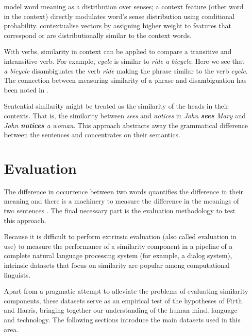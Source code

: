  model word meaning as a distribution over senses; a context feature (other word in the context)  directly modulates word’s sense distribution using conditional probability.  contextualise vectors by assigning higher weight to features that correspond or are distributionally similar to the context words.


With verbs, similarity in context can be applied to compare a transitive and intransitive verb. For example, \textit{cycle} is similar to \textit{ride a bicycle}. Here we see that \textit{a bicycle} disambiguates the verb \textit{ride} making the phrase similar to the verb \textit{cycle}. The connection between measuring similarity of a phrase and disambiguation has been noted in .


Sentential similarity might be treated as the similarity of the heads in their contexts. That is, the similarity between \textit{sees} and \textit{notices} in \textit{John \textbf{sees} Mary} and \textit{John \textbf{notices} a woman}. This approach abstracts away the grammatical difference between the sentences and concentrates on their semantics.

\section{Evaluation}
\label{sec:intrinsic-evaluation}

The difference in occurrence between two words quantifies the difference in their meaning \cite{harris1954distributional} and there is a machinery to measure the difference in the meanings of two sentences \cite{DBLP:journals/corr/abs-1003-4394}. The final necessary part is the evaluation methodology to test this approach.

Because it is difficult to perform extrinsic evaluation (also called evaluation in use) to measure the performance of a similarity component in a pipeline of a complete natural language processing system (for example, a dialog system), intrinsic datasets that focus on similarity are popular among computational linguists.

Apart from a pragmatic attempt to alleviate the problems of evaluating
similarity components, these datasets serve as an empirical test of the
hypotheses of Firth and Harris, bringing together our understanding of the human mind, language and technology. The following sections introduce the main datasets used in this area.

